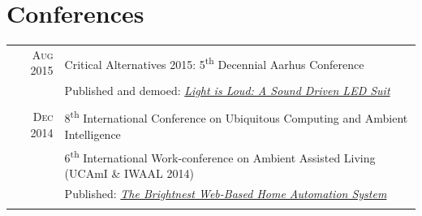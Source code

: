 \documentclass[letterpaper,10pt]{article}
\begin{document}
\section{Conferences}
\begin{tabular}{R|B}
	\textsc{Aug} 2015 & Critical Alternatives 2015: 5\textsuperscript{th} Decennial Aarhus Conference                        \\
	                  & \small Published and demoed: \href{https://doi.org/10.7146/aahcc.v1i1.21320}
	{\emph{Light is Loud: A Sound Driven LED Suit}}                                                                          \\
	                                                                                                     \\

	\textsc{Dec} 2014 & 8\textsuperscript{th} International Conference on Ubiquitous Computing and Ambient Intelligence      \\
	                  & 6\textsuperscript{th} International Work-conference on Ambient Assisted Living (UCAmI \& IWAAL 2014) \\
	                  & \small Published: \href{https://doi.org/10.1007/978-3-319-13102-3_14}
	{\emph{The Brightnest Web-Based Home Automation System}}                                                                 \\
	                                                                                                     \\

\end{tabular}

\end{document}

